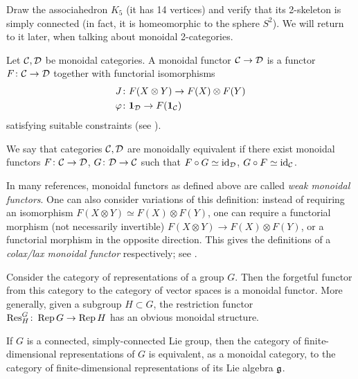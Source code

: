 \begin{exercise}\label{ec:K5}
  Draw the associahedron $K_5$ (it has 14 vertices) and verify that its
  2-skeleton is simply connected (in fact, it is homeomorphic to the sphere
  $S^2$). We will return to it later, when talking about monoidal 2-categories.
\end{exercise}

\begin{definition}\label{d:monoidal_functor}
  Let $\mathcal{C}, \mathcal{D}$ be monoidal categories. A monoidal functor
  $\mathcal{C}\to \mathcal{D}$ is a functor $F\colon\mathcal{C}\to\mathcal{D}$ together
  with functorial isomorphisms
  \begin{align*}
    J&\colon F(X\otimes Y)\to F(X)\otimes F(Y)\\
    \varphi&\colon \mathbf{1}_{\mathcal{D}}\to F(\mathbf{1}_{\mathcal{C}})
  \end{align*}
  satisfying suitable constraints (see \cite[Section 2.4]{etingof-fusion}).

  We say that categories $\mathcal{C}, \mathcal{D}$ are monoidally equivalent
  if there exist monoidal functors $F\colon \mathcal{C}\to \mathcal{D}$, $G\colon \mathcal{D}\to
  \mathcal{C}$ such that $F\circ G\simeq \operatorname{id}_{\mathcal{D}}$, $G\circ F \simeq \operatorname{id}_{\mathcal{C}}$.
\end{definition}

\begin{remark}\label{r:lax}
  In many references, monoidal functors as defined above are called \emph{weak
  monoidal functors}. One can also consider variations of this definition:
  instead of requiring an isomorphism $F(X\otimes Y)\simeq F(X)\otimes F(Y)$,
  one can require a functorial morphism (not necessarily invertible)
  $F(X\otimes Y)\to F(X)\otimes F(Y)$, or a functorial morphism in the opposite
  direction.  This gives the definitions of a \emph{colax/lax monoidal functor}
  respectively; see \cite[Definition 1.2.10]{leinster}.
\end{remark}


\begin{example}\label{x:rep-group-monoidal}
  Consider the category of representations of a group $G$. Then the
  forgetful functor from this category to the category of vector
  spaces is a monoidal functor. More generally, given
  a subgroup $H\subset G$, the restriction functor
  $\operatorname{Res}^G_H\colon \operatorname{Rep} G\to\operatorname{Rep} H$ has an
  obvious monoidal structure.
\end{example}
\begin{example}\label{x:rep-lie-group}
  If $G$ is a connected, simply-connected Lie group, then the category
  of finite-dimensional representations of $G$ is equivalent, as a
  monoidal category, to the category of finite-dimensional
  representations of its Lie
  algebra $\mathfrak{g}$.
\end{example}


